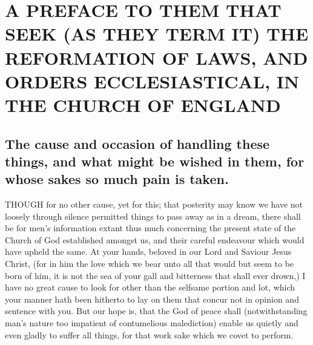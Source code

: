\chapter*[Preface]{A PREFACE TO THEM THAT SEEK (AS THEY TERM IT) THE 
REFORMATION OF LAWS, AND ORDERS ECCLESIASTICAL, IN THE CHURCH OF ENGLAND}
\label{chap:preface}


\section*{The cause and occasion of handling these things, and what might be wished in them, for whose sakes so much pain is taken.}

THOUGH for no other cause, yet for this; that posterity may know we have not loosely through silence permitted things to pass away as in a dream, there shall be for men’s information extant thus much concerning the present state of the Church of God established amongst us, and their careful endeavour which would have upheld the same. At your hands, beloved in our Lord and Saviour Jesus Christ, (for in him the love which we bear unto all that would but seem to be born of him, it is not the sea of your gall and bitterness that shall ever drown,) I have no great cause to look for other than the selfsame portion and lot, which your manner hath been hitherto to lay on them that concur not in opinion and sentence with you. But our hope is, that the God of peace shall (notwithstanding man’s nature too impatient of contumelious malediction) enable us quietly and even gladly to suffer all things, for that work sake which we covet to perform.

